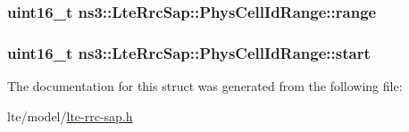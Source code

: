 \subsubsection[{\texorpdfstring{range}{range}}]{\setlength{\rightskip}{0pt plus 5cm}uint16\+\_\+t ns3\+::\+Lte\+Rrc\+Sap\+::\+Phys\+Cell\+Id\+Range\+::range}\hypertarget{structns3_1_1LteRrcSap_1_1PhysCellIdRange_af87b98f145256e2f319eb510799ec185}{}\label{structns3_1_1LteRrcSap_1_1PhysCellIdRange_af87b98f145256e2f319eb510799ec185}
\subsubsection[{\texorpdfstring{start}{start}}]{\setlength{\rightskip}{0pt plus 5cm}uint16\+\_\+t ns3\+::\+Lte\+Rrc\+Sap\+::\+Phys\+Cell\+Id\+Range\+::start}\hypertarget{structns3_1_1LteRrcSap_1_1PhysCellIdRange_a6ff6aa3a8213e0c8f7a588d315223004}{}\label{structns3_1_1LteRrcSap_1_1PhysCellIdRange_a6ff6aa3a8213e0c8f7a588d315223004}


The documentation for this struct was generated from the following file\+:\begin{DoxyCompactItemize}
\item 
lte/model/\hyperlink{lte-rrc-sap_8h}{lte-\/rrc-\/sap.\+h}\end{DoxyCompactItemize}
